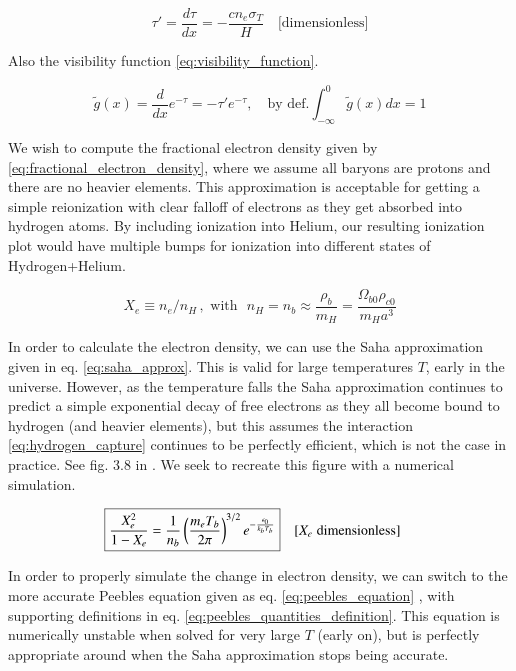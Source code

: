 \begin{equation}\label{eq:tau_ODE}
\boxed{\tau' = \frac{d\tau}{dx} = -\frac{c n_e \sigma_T }{H}} \quad \text{[dimensionless]}
\end{equation}

Also the visibility function \ref{eq:visibility_function}.

\begin{equation}\label{eq:visibility_function}
\tilde{g}(x) = \frac{d}{dx}e^{-\tau} = -\tau' e^{-\tau}, \quad \text{by def.} \int_{-\infty}^{0} \tilde{g}(x)dx = 1
\end{equation}

We wish to compute the fractional electron density given by \ref{eq:fractional_electron_density}, where we assume all baryons are protons and there are no heavier elements. This approximation is acceptable for getting a simple reionization with clear falloff of electrons as they get absorbed into hydrogen atoms. By including ionization into Helium, our resulting ionization plot would have multiple bumps for ionization into different states of Hydrogen+Helium.


\begin{equation}\label{eq:fractional_electron_density}
\boxed{X_e \equiv n_e / n_H}\,, \text{ with } \,\, n_H = n_b \approx \frac{\rho_b}{m_H} = \frac{\Omega_{b0} \rho_{c0}}{m_H a^3}
\end{equation}


In order to calculate the electron density, we can use the Saha approximation given in eq. \ref{eq:saha_approx}. This is valid for large temperatures $T$, early in the universe. However, as the temperature falls the Saha approximation continues to predict a simple exponential decay of free electrons as they all become bound to hydrogen (and heavier elements), but this assumes the interaction \ref{eq:hydrogen_capture} continues to be perfectly efficient, which is not the case in practice. See fig. 3.8 in \citet[sec. 3.3.3]{baumannLectureNotesCosmology2017}. We seek to recreate this figure with a numerical simulation.

\begin{equation}\label{eq:saha_approx}
\begin{aligned}
\Aboxed{\frac{X_e^2}{1-X_e} = \frac{1}{n_b} \left(\frac{m_e T_b}{2\pi}\right)^{3/2} e^{-\frac{\epsilon_0}{k_b T_b}}} \quad [X_e \; \rm dimensionless]
\end{aligned}
\end{equation}

In order to properly simulate the change in electron density, we can switch to the more accurate Peebles equation given as eq. \ref{eq:peebles_equation} \citep{peeblesRecombinationPrimevalPlasma1968,zeldovichRecombinationHydrogenHot1969}, with supporting definitions in eq. \ref{eq:peebles_quantities_definition}. This equation is numerically unstable when solved for very large $T$ (early on), but is perfectly appropriate around when the Saha approximation stops being accurate.

